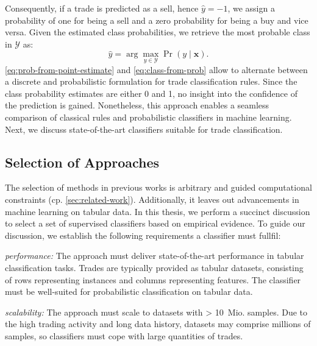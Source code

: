 
Consequently, if a trade is predicted as a sell, hence $\hat{y} = -1$, we assign a probability of one for being a sell and a zero probability for being a buy and vice versa. Given the estimated class probabilities, we retrieve the most probable class in $\mathcal{Y}$ as:
\begin{equation}
    \hat{y}=\arg\max_{y \in \mathcal{Y}} \operatorname{Pr}(y \mid \mathbf{x}).
    \label{eq:class-from-prob}
\end{equation}
\cref{eq:prob-from-point-estimate} and \cref{eq:class-from-prob} allow to alternate between a discrete and probabilistic formulation for trade classification rules. Since the class probability estimates are either 0
and 1, no insight into the confidence of the prediction is gained. Nonetheless, this approach enables a seamless comparison of classical rules and probabilistic classifiers in machine learning. Next, we discuss state-of-the-art classifiers suitable for trade classification.

\subsection{Selection of Approaches}\label{sec:selection-of-approaches}


The selection of methods in previous works is arbitrary and guided computational constraints (cp. \cref{sec:related-work}). Additionally, it leaves out advancements in machine learning on tabular data.
In this thesis, we perform a succinct discussion to select a set of supervised classifiers based on empirical evidence. To guide our discussion, we establish the following requirements a classifier must fullfil:

\emph{performance:} The approach must deliver state-of-the-art performance in tabular classification tasks. Trades are typically provided as tabular datasets, consisting of rows representing instances and columns representing features. The classifier must be well-suited for probabilistic classification on tabular data.

\emph{scalability:}  The approach must scale to datasets with > 10~Mio. samples. Due to the high trading activity and long data history, datasets may comprise millions of samples, so classifiers must cope with large quantities of trades.

